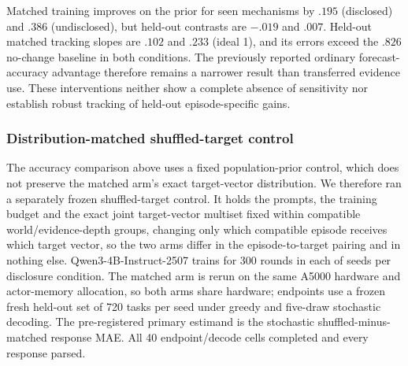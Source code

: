 \begin{table}[htbp]
\centering\footnotesize
\setlength{\tabcolsep}{3pt}

\caption{\textbf{Better gain tracking on seen mechanisms does not establish
transferred evidence use.} Entries are response-change MAE (lower is better);
trained entries average seeds 45 and 46. No change is an invariant predictor.
Positive prior-minus-matched contrasts favor matched training. Both held-out
intervals include zero, and matched held-out errors exceed the no-change baseline.}
\label{tab:exp3-gain-evidence}
\end{table}

Matched training improves on the prior for seen mechanisms by $.195$
(disclosed) and $.386$ (undisclosed), but held-out contrasts are $-.019$ and
$.007$. Held-out matched tracking slopes are $.102$ and $.233$ (ideal 1),
and its errors exceed the $.826$ no-change baseline in both conditions.
The previously reported ordinary forecast-accuracy advantage therefore remains
a narrower result than transferred evidence use. These interventions neither
show a complete absence of sensitivity nor establish robust tracking of
held-out episode-specific gains.

\subsubsection{Distribution-matched shuffled-target control}
\label{app:exp3-shuffled-control}

The accuracy comparison above uses a fixed population-prior control, which does
not preserve the matched arm's exact target-vector distribution. We therefore
ran a separately frozen shuffled-target control. It holds the prompts, the
training budget and the exact joint target-vector multiset fixed within
compatible world/evidence-depth groups, changing only which compatible episode
receives which target vector, so the two arms differ in the episode-to-target
pairing and in nothing else. Qwen3-4B-Instruct-2507 trains for 300 rounds in
each of \eShufG{} seeds per disclosure condition. The matched arm is rerun on
the same A5000 hardware and actor-memory allocation, so both arms share
hardware; endpoints use a frozen fresh held-out set of 720 tasks per seed under
greedy and five-draw stochastic decoding. The pre-registered primary estimand
is the stochastic shuffled-minus-matched response MAE. All 40 endpoint/decode
cells completed and every response parsed.

\begin{table}[htbp]
\centering\footnotesize
\setlength{\tabcolsep}{3pt}

\caption{\textbf{Matched training retains a smaller advantage over a
distribution-matched shuffled-target control.} Entries are shuffled-minus-matched
response MAE at \eShufG{} training seeds; positive favors matched training.
The hierarchical interval resamples seeds and trajectories; Webb $p$ is a
two-sided wild cluster bootstrap. The stochastic inferred-mechanism cell is the
pre-registered primary endpoint and the only cell clearing every estimator.}
\label{tab:exp3-shuffled-control}
\end{table}

